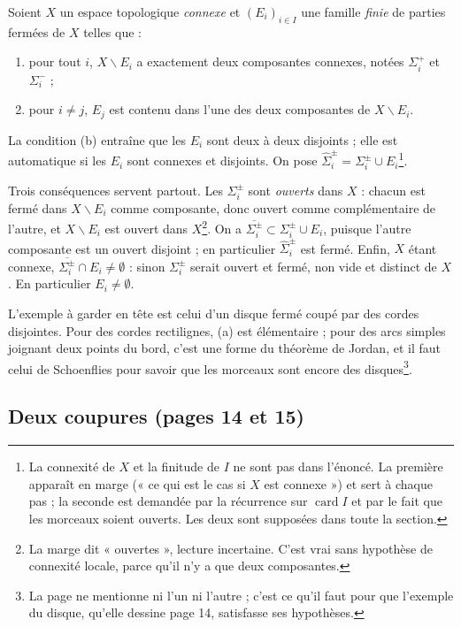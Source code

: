 \documentclass[11pt,a4paper]{article}
\begin{document}
Soient $X$ un espace topologique \emph{connexe} et $(E_i)_{i \in I}$ une
famille \emph{finie} de parties fermées de $X$ telles que :
\begin{enumerate}
  \item[(a)] pour tout $i$, $X \smallsetminus E_i$ a exactement deux
  composantes connexes, notées $\Sigma_i^{+}$ et $\Sigma_i^{-}$ ;
  \item[(b)] pour $i \neq j$, $E_j$ est contenu dans l'une des deux
  composantes de $X \smallsetminus E_i$.
\end{enumerate}
La condition (b) entraîne que les $E_i$ sont deux à deux disjoints ; elle
est automatique si les $E_i$ sont connexes et disjoints. On pose
$\widehat{\Sigma}_i^{\pm} = \Sigma_i^{\pm} \cup E_i$\footnote{La connexité de
$X$ et la finitude de $I$ ne sont pas dans l'énoncé. La première apparaît en
marge (« ce qui est le cas si $X$ est connexe ») et sert à chaque pas ; la
seconde est demandée par la récurrence sur $\operatorname{card} I$ et par le
fait que les morceaux soient ouverts. Les deux sont supposées dans toute la
section.}.

Trois conséquences servent partout. Les $\Sigma_i^{\pm}$ sont \emph{ouverts}
dans $X$ : chacun est fermé dans $X \smallsetminus E_i$ comme composante, donc
ouvert comme complémentaire de l'autre, et $X \smallsetminus E_i$ est ouvert
dans $X$\footnote{La marge dit « ouvertes », lecture incertaine. C'est vrai
sans hypothèse de connexité locale, parce qu'il n'y a que deux
composantes.}. On a $\overline{\Sigma_i^{\pm}} \subset \Sigma_i^{\pm} \cup
E_i$, puisque l'autre composante est un ouvert disjoint ; en particulier
$\widehat{\Sigma}_i^{\pm}$ est fermé. Enfin, $X$ étant connexe,
$\overline{\Sigma_i^{\pm}} \cap E_i \neq \emptyset$ : sinon $\Sigma_i^{\pm}$
serait ouvert et fermé, non vide et distinct de $X$. En particulier $E_i \neq
\emptyset$.

L'exemple à garder en tête est celui d'un disque fermé coupé par des cordes
disjointes. Pour des cordes rectilignes, (a) est élémentaire ; pour des arcs
simples joignant deux points du bord, c'est une forme du théorème de Jordan,
et il faut celui de Schoenflies pour savoir que les morceaux sont encore des
disques\footnote{La page ne mentionne ni l'un ni l'autre ; c'est ce qu'il
faut pour que l'exemple du disque, qu'elle dessine page 14, satisfasse ses
hypothèses.}.

\subsection*{Deux coupures (pages 14 et 15)}
\end{document}
